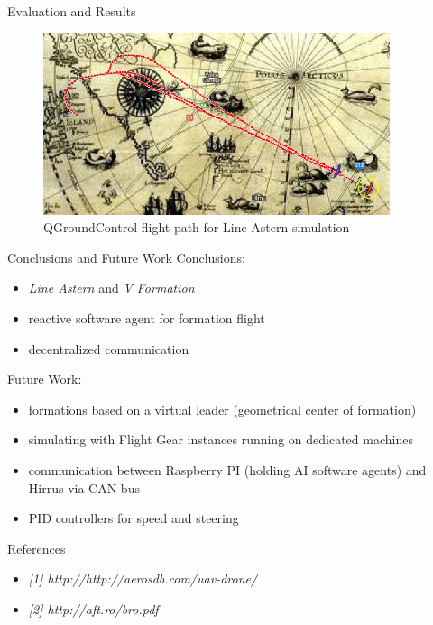 \documentclass{beamer}
\begin{document}
\begin{frame}{Evaluation and Results}
\begin{center}
\begin{figure}[p]
\includegraphics[width=4in]{img/lineastern.png}
\caption{QGroundControl flight path for Line Astern simulation}
\end{figure}
\end{center}
\end{frame}

\begin{frame}{Conclusions and Future Work}
Conclusions:
\begin{itemize}
\item \textit{Line Astern} and \textit{V Formation}
\item reactive software agent for formation flight
\item decentralized communication
\end{itemize}
Future Work:
\begin{itemize}
\item formations based on a virtual leader (geometrical center of formation)
\item simulating with Flight Gear instances running on dedicated machines
\item communication between Raspberry PI (holding AI software agents) and Hirrus via CAN bus
\item PID controllers for speed and steering
\end{itemize}
\end{frame}

\begin{frame}{References}
\begin{itemize}
\item \textit{[1] http://http://aerosdb.com/uav-drone/}
\item \textit{[2] http://aft.ro/bro.pdf}
\end{itemize}
\end{frame}
\end{document}
